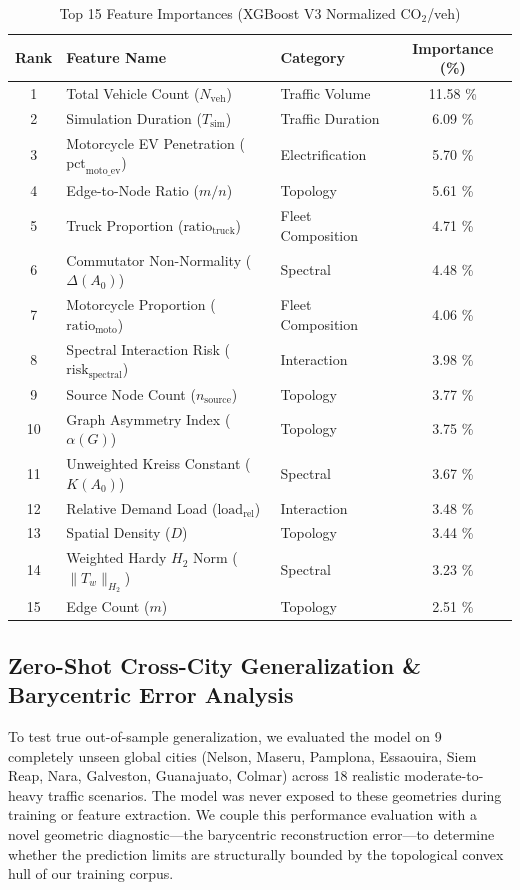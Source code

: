 \documentclass[lettersize,journal]{IEEEtran}
\begin{document}
\begin{table}[htbp]
\caption{Top 15 Feature Importances (XGBoost V3 Normalized $\text{CO}_2$/veh)}
\label{tab:feature_importance}
\centering
\begin{tabular}{cllc}
\toprule
Rank & Feature Name & Category & Importance (\%) \\
\midrule
1 & Total Vehicle Count ($N_{\text{veh}}$) & Traffic Volume & 11.58 \% \\
2 & Simulation Duration ($T_{\text{sim}}$) & Traffic Duration & 6.09 \% \\
3 & Motorcycle EV Penetration ($\text{pct}_{\text{moto\_ev}}$) & Electrification & 5.70 \% \\
4 & Edge-to-Node Ratio ($m/n$) & Topology & 5.61 \% \\
5 & Truck Proportion ($\text{ratio}_{\text{truck}}$) & Fleet Composition & 4.71 \% \\
6 & Commutator Non-Normality ($\Delta(A_0)$) & Spectral & 4.48 \% \\
7 & Motorcycle Proportion ($\text{ratio}_{\text{moto}}$) & Fleet Composition & 4.06 \% \\
8 & Spectral Interaction Risk ($\text{risk}_{\text{spectral}}$) & Interaction & 3.98 \% \\
9 & Source Node Count ($n_{\text{source}}$) & Topology & 3.77 \% \\
10 & Graph Asymmetry Index ($\alpha(G)$) & Topology & 3.75 \% \\
11 & Unweighted Kreiss Constant ($K(A_0)$) & Spectral & 3.67 \% \\
12 & Relative Demand Load ($\text{load}_{\text{rel}}$) & Interaction & 3.48 \% \\
13 & Spatial Density ($D$) & Topology & 3.44 \% \\
14 & Weighted Hardy $H_2$ Norm ($\|T_w\|_{H_2}$) & Spectral & 3.23 \% \\
15 & Edge Count ($m$) & Topology & 2.51 \% \\
\bottomrule
\end{tabular}
\end{table}

\subsection{Zero-Shot Cross-City Generalization \& Barycentric Error Analysis}
To test true out-of-sample generalization, we evaluated the model on 9 completely unseen global cities (Nelson, Maseru, Pamplona, Essaouira, Siem Reap, Nara, Galveston, Guanajuato, Colmar) across 18 realistic moderate-to-heavy traffic scenarios. The model was never exposed to these geometries during training or feature extraction. We couple this performance evaluation with a novel geometric diagnostic—the barycentric reconstruction error—to determine whether the prediction limits are structurally bounded by the topological convex hull of our training corpus.
\end{document}
